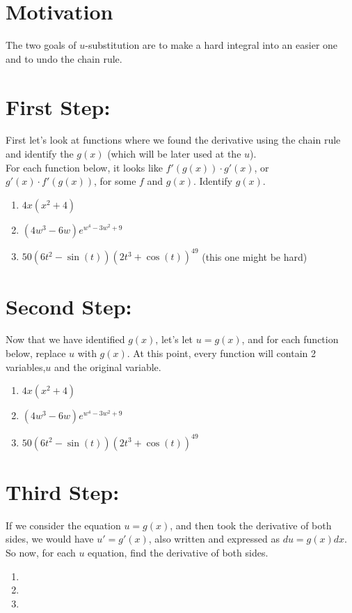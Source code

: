 \documentclass{article}[12pt]
\theoremstyle{definition}
\theoremstyle{example}
\theoremstyle{theorem}
\begin{document}
\section*{Motivation}
The two goals of $u$-substitution are to make a hard integral into an easier one and to undo the chain rule.  \\
\section{First Step:}
First let's look at functions where we found the derivative using the chain rule and identify the $g(x)$ (which will be later used at the $u$). \\
For each function below, it looks like $f'(g(x))\cdot g'(x)$, or $g'(x)\cdot f'(g(x))$, for some $f$ and $g(x)$. Identify $g(x)$. 
\begin{enumerate}
\item $4x(x^2+4)$
\item $(4w^3-6w)e^{w^4-3w^2+9}$
\item $50(6t^2-\sin(t))(2t^3+\cos(t))^{49}$
 (this one might be hard)
\end{enumerate}
\section{Second Step:}
Now that we have identified $g(x)$, let's let $u=g(x)$, and for each function below, replace $u$ with $g(x)$. At this point, every function will contain 2 variables,$u$ and the original variable.  
\begin{enumerate}
\item $4x(x^2+4)$
\vspace{1.5cm}
\item $(4w^3-6w)e^{w^4-3w^2+9}$
\vspace{1.5cm}
\item $50(6t^2-\sin(t))(2t^3+\cos(t))^{49}$
\vspace{1.5cm}

\end{enumerate}
\section{Third Step:}
If we consider the equation $u=g(x)$, and then took the derivative of both sides, we would have $u'=g'(x)$, also written and expressed as $du=g(x)dx$. So now, for each $u$ equation, find the derivative of both sides. 
\begin{enumerate}
\item 
\item 
\item 

\end{enumerate}
\end{document}
